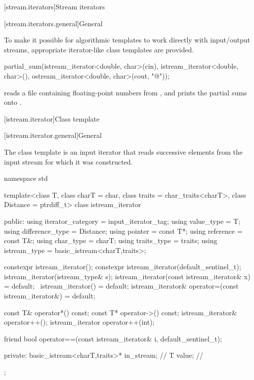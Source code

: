 [stream.iterators]{Stream iterators}

[stream.iterators.general]{General}

\pnum
To make it possible for algorithmic templates to work directly with input/output streams, appropriate
iterator-like
class templates
are provided.

\begin{example}
\begin{codeblock}
partial_sum(istream_iterator<double, char>(cin),
  istream_iterator<double, char>(),
  ostream_iterator<double, char>(cout, "@\textbackslash@n"));
\end{codeblock}

reads a file containing floating-point numbers from
,
and prints the partial sums onto
.
\end{example}

[istream.iterator]{Class template }

[istream.iterator.general]{General}

\pnum
{}%
The class template 
is an input iterator that reads successive elements
from the input stream for which it was constructed.

\begin{codeblock}
namespace std {
  template<class T, class charT = char, class traits = char_traits<charT>,
           class Distance = ptrdiff_t>
  class istream_iterator {
  public:
    using iterator_category = input_iterator_tag;
    using value_type        = T;
    using difference_type   = Distance;
    using pointer           = const T*;
    using reference         = const T&;
    using char_type         = charT;
    using traits_type       = traits;
    using istream_type      = basic_istream<charT,traits>;

    constexpr istream_iterator();
    constexpr istream_iterator(default_sentinel_t);
    istream_iterator(istream_type& s);
    istream_iterator(const istream_iterator& x) = default;
    ~istream_iterator() = default;
    istream_iterator& operator=(const istream_iterator&) = default;

    const T& operator*() const;
    const T* operator->() const;
    istream_iterator& operator++();
    istream_iterator  operator++(int);

    friend bool operator==(const istream_iterator& i, default_sentinel_t);

  private:
    basic_istream<charT,traits>* in_stream; // \expos
    T value;                                // \expos
  };
}
\end{codeblock}

